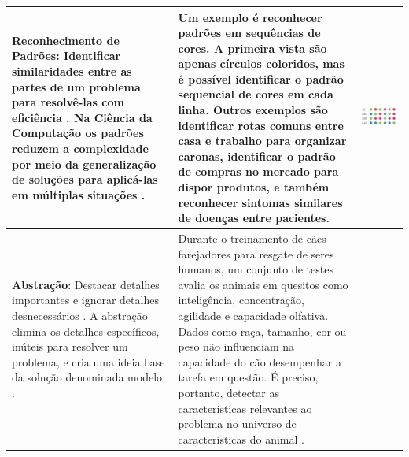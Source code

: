 \begin{landscape}
\begin{quadro}[!htbp]
\begin{center}
\begin{footnotesize}
\begin{tabular}{|p{6cm}|p{9cm}|p{5cm}|}
            \textbf{Reconhecimento de Padrões}: Identificar similaridades entre as partes de um problema para resolvê-las com eficiência \cite{bbc_learning_what_2015}. Na Ciência da Computação os padrões reduzem a complexidade por meio da generalização de soluções para aplicá-las em múltiplas situações \cite{k-12_computer_science_framework_k12_2016}.
            &
            Um exemplo é reconhecer padrões em sequências de cores. A primeira vista são apenas círculos coloridos, mas é possível identificar o padrão sequencial de cores em cada linha. Outros exemplos são identificar rotas comuns entre casa e trabalho para organizar caronas, identificar o padrão de compras no mercado para dispor produtos, e também reconhecer sintomas similares de doenças entre pacientes.
            &
            \begin{center}
                \includegraphics[width=1\linewidth]{figs/pattern_recognition.png}    
            \end{center}
            \\ \hline
            \textbf{Abstração}: Destacar detalhes importantes e ignorar detalhes desnecessários \cite{wing_computational_2008}. A abstração elimina os detalhes específicos, inúteis para resolver um problema, e cria uma ideia base da solução denominada modelo \cite{bbc_learning_what_2015}.
            &
            Durante o treinamento de cães farejadores para resgate de seres humanos, um conjunto de testes avalia os animais em quesitos como inteligência, concentração, agilidade e capacidade olfativa. Dados como raça, tamanho, cor ou peso não influenciam na capacidade do cão desempenhar a tarefa em questão. É preciso, portanto, detectar as características relevantes ao problema no universo de características do animal \cite{davidson_12_2018}.
            &
            \begin{center}

\end{center}
\end{tabular}
\end{footnotesize}
\end{center}
\end{quadro}
\end{landscape}
